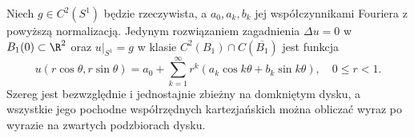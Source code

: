\begin{stwierdzenie}
\label{prop:pde3-fourier-disk}
Niech $g\in C^2(S^1)$ będzie rzeczywista, a
$a_0,a_k,b_k$ jej współczynnikami Fouriera z powyższą
normalizacją. Jedynym rozwiązaniem zagadnienia
$\Delta u=0$ w $B_1(0)\subset\R^2$ oraz $u|_{S^1}=g$
w klasie $C^2(B_1)\cap C(\overline{B_1})$
jest funkcja
\begin{equation}\label{eq:pde3-fourier-disk}
 u(r\cos\theta,r\sin\theta)=a_0+
 \sum_{k=1}^\infty r^k
 (a_k\cos k\theta+b_k\sin k\theta),\quad 0\leq r<1.
\end{equation}
Szereg jest bezwzględnie i jednostajnie zbieżny
na domkniętym dysku, a wszystkie jego pochodne
współrzędnych kartezjańskich można obliczać wyraz
po wyrazie na zwartych podzbiorach dysku.
\end{stwierdzenie}
